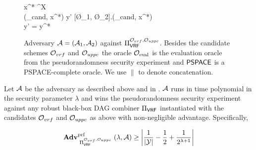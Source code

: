 \begin{figure}[hptb]
\begin{pcvstack}[center, space=1em]
{			x^* \sample \bin^\lambda \setminus \mathcal X\\ 
			\pcreturn (\sk_{cand}, x^*)
		}
		{
			y' \gets {}[\O_1, \O_2].(\sk_{cand}, x^*)\\ 
			\pcreturn y' = y^*
		}
	\end{pcvstack}
	\caption{Adversary $\mathcal{A} = (\mathcal{A}_1, \mathcal{A}_2)$ against $\BBComb{VRF}[\O_{vrf}, \O_{uppc}]$. Besides the candidate schemes $\mathcal{O}_{vrf}$ and $\mathcal{O}_{uppc}$ the oracle $\mathcal{O}_{\text{eval}}$ is the evaluation oracle from
	the pseudorandomness security experiment and $\textup{\textsf{PSPACE}}$ is a PSPACE-complete oracle. We use $\|$ to denote concatenation.}
	\label{fig:distinguisher}
\end{figure}

\begin{claim}\label{claim:advantage_distinguisher}
	Let $\mathcal{A}$ be the adversary as described above and in . $\mathcal{A}$ runs in time polynomial in 
	the security parameter $\lambda$ and wins the pseudorandomness security experiment against any robust black-box DAG combiner $\BBComb{VRF}$
	instantiated with the candidates $\mathcal{O}_{vrf}$ and $\mathcal{O}_{uppc}$ as above with non-negligible advantage.
	Specifically,

	\[
		\Adv{\BBComb{VRF}[\O_{vrf}, \O_{uppc}]}{prf}{\lambda, \mathcal A} \ge \abs*{\frac{1}{|\Y|} - \frac{1}{2} + \frac{1}{2^{\lambda + 1}}}
	\]\
\end{claim}

